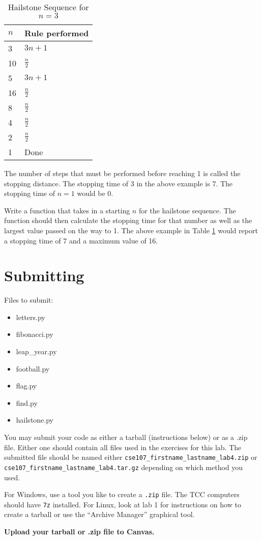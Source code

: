 \documentclass[11pt]{cselabheader}
\begin{document}
\begin{description}
  \begin{table}[!ht]
    \centering
    \begin{tabular}{ll}
      \toprule
      $n$ & Rule performed\\
      \midrule
      3 & $3n + 1$\\
      10 & $\frac{n}{2}$\\
      5 & $3n + 1$\\
      16 & $\frac{n}{2}$\\
      8 & $\frac{n}{2}$\\
      4 & $\frac{n}{2}$\\
      2 & $\frac{n}{2}$\\
      1 & Done\\
      \bottomrule
    \end{tabular}
    \caption{Hailstone Sequence for $n = 3$}
    \label{ex:hailstone}
  \end{table}

  The number of steps that must be performed before
  reaching 1 is called the stopping distance. The stopping
  time of 3 in the above example is 7. The stopping
  time of $n = 1$ would be 0.

  Write a function that takes in a starting $n$ for the
  hailstone sequence. The function should then calculate the
  stopping time for that number as well as the largest value
  passed on the way to 1. The above example in Table \ref{ex:hailstone}
  would report a stopping time of 7 and a maximum value of 16.
\end{description} 

\section{Submitting}

Files to submit:
\begin{itemize}
  \item letters.py
  \item fibonacci.py
  \item leap\_year.py
  \item football.py
  \item flag.py
  \item find.py
  \item hailstone.py
\end{itemize}

You may submit your code as either a tarball (instructions below) or as a .zip
file. Either one should contain all files used in the exercises for this lab.
The submitted file should be named either
\texttt{cse107\_firstname\_lastname\_lab4.zip} or
\texttt{cse107\_firstname\_lastname\_lab4.tar.gz} depending on which method you
used.

For Windows, use a tool you like to create a \texttt{.zip} file. The TCC
computers should have \texttt{7z} installed. For Linux, look at lab 1 for
instructions on how to create a tarball or use the ``Archive Manager'' graphical
tool.

\begin{center}
  \textbf{Upload your tarball or .zip file to Canvas.}
\end{center}
\end{document}
